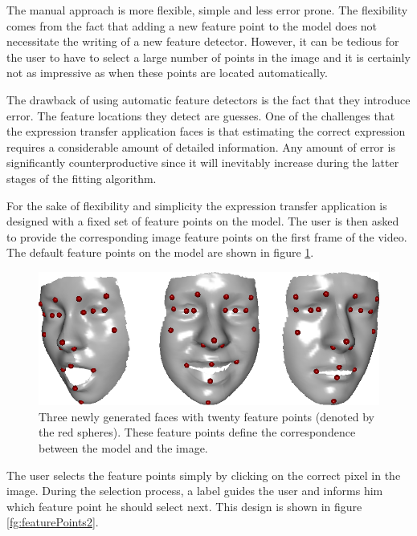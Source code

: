 \documentclass[11pt,a4paper]{report}
\begin{document}
The manual approach is more flexible, simple and less error prone. The
flexibility comes from the fact that adding a new feature point to the model
does not necessitate the writing of a new feature detector. However, it can be
tedious for the user to have to select a large number of points in the image and
it is certainly not as impressive as when these points are located
automatically. 

The drawback of using automatic feature detectors is the fact that they
introduce error. The feature locations they detect are guesses. One of the
challenges that the expression transfer application faces is that estimating the
correct expression requires a considerable amount of detailed information. Any amount of error is
significantly counterproductive since it will inevitably increase during the
latter stages of the fitting algorithm.

For the sake of flexibility and simplicity the expression transfer application
is designed with a fixed set of feature points on the model. The user is then
asked to provide the corresponding image feature points on the first frame of the
video. The default feature points on the model are shown in figure
\ref{fg:featurePoints}.

\begin{figure}[H]
\begin{centering}
\includegraphics[scale=0.40]{images/featurePoints.png}
\par\end{centering}

\caption{Three newly generated faces with twenty feature points (denoted by the
  red spheres). These feature points define the correspondence between the model
  and the image.}
\label{fg:featurePoints}
\end{figure}

The user selects the feature points simply by clicking on the correct pixel in
the image. During the selection process, a label guides the user and informs
him which feature point he should select next. This design is shown in figure
\ref{fg:featurePoints2}.
\end{document}
